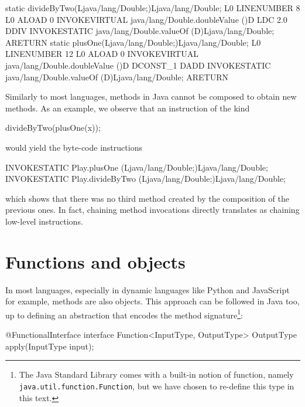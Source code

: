 \documentclass[12pt,a4paper]{report}
\renewcommand{\baselinestretch}{1.5}
\theoremstyle{theorem}
\theoremstyle{definition}
\begin{document}
\pagebreak

\renewcommand{\baselinestretch}{1} 
\selectfont
\begin{javacode}
static divideByTwo(Ljava/lang/Double;)Ljava/lang/Double;
 L0
  LINENUMBER 8 L0
  ALOAD 0
  INVOKEVIRTUAL java/lang/Double.doubleValue ()D
  LDC 2.0
  DDIV
  INVOKESTATIC java/lang/Double.valueOf (D)Ljava/lang/Double;
  ARETURN
static plusOne(Ljava/lang/Double;)Ljava/lang/Double;
 L0
  LINENUMBER 12 L0
  ALOAD 0
  INVOKEVIRTUAL java/lang/Double.doubleValue ()D
  DCONST_1
  DADD
  INVOKESTATIC java/lang/Double.valueOf (D)Ljava/lang/Double;
  ARETURN
\end{javacode}
\renewcommand{\baselinestretch}{1.5} 
\selectfont

Similarly to most languages, methods in Java cannot be
composed to obtain new methods. As an example, we observe that
an instruction of the kind

\renewcommand{\baselinestretch}{1} 
\selectfont
\begin{javacode}
divideByTwo(plusOne(x));
\end{javacode}
\renewcommand{\baselinestretch}{1.5} 
\selectfont

would yield the byte-code instructions

\renewcommand{\baselinestretch}{1} 
\selectfont
\begin{javacode}
INVOKESTATIC Play.plusOne (Ljava/lang/Double;)Ljava/lang/Double;
INVOKESTATIC Play.divideByTwo (Ljava/lang/Double;)Ljava/lang/Double;
\end{javacode}
\renewcommand{\baselinestretch}{1.5} 
\selectfont

which shows that there was no third method created by the composition
of the previous ones. In fact, chaining method invocations directly
translates as chaining low-level instructions.

\section{Functions and objects}

In most languages, especially in dynamic languages like Python and JavaScript
for example, methods are also objects. This approach can be followed
in Java too, up to defining an abstraction that encodes the
method signature\footnote{The Java Standard Library 
comes with a built-in notion of function,
namely \lstinline{java.util.function.Function}{},
but we have chosen to re-define this type in this text.}:

\renewcommand{\baselinestretch}{1} 
\selectfont
\begin{javacode}
@FunctionalInterface
interface Function<InputType, OutputType>
{
  OutputType apply(InputType input);
}
\end{javacode}
\end{document}
